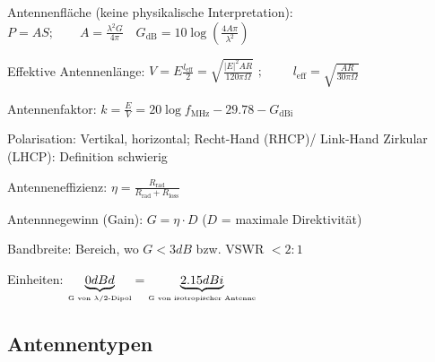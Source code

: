 \begin{liste}
    \item Antennenfläche (keine physikalische Interpretation): 
        $P = AS; \qquad A = \frac{\lambda^2 G}{4\pi} \quad G_{\text{dB}} = 10
        \log\left(\frac{4A\pi}{\lambda^2}\right)$
    \item Effektive Antennenlänge: 
    $V= E \frac{l_{\text{eff}}}2 = \sqrt{\frac{|E|^2AR}{120\pi \Omega}}$
    $;\qquad$ $l_{\text{eff}} = \sqrt{\frac{AR}{30\pi \Omega}}$
    \item Antennenfaktor: $k = \frac{E}{V} = 20 \log
    f_{\text{MHz}}-29.78-G_{\text{dBi}}$
    \item Polarisation: Vertikal, horizontal; Recht-Hand (RHCP)/
    Link-Hand Zirkular (LHCP): Definition schwierig 
    \item Antenneneffizienz: $\eta = \frac{R_{\text{rad}}}{R_{\text{rad}} +
    R_{\text{loss}}}$
    \item Antennnegewinn (Gain): $G=\eta \cdot D$ ($D$ = maximale Direktivität)
    \item Bandbreite: Bereich, wo $G < 3dB$ bzw. VSWR $< 2:1$
    \item Einheiten: $\underbrace{0dBd}_{\text{\tiny{G von $\lambda/2$-Dipol}}}
    = \underbrace{2.15dBi}_{\text{\tiny{G von isotropischer Antenne}}}$
\end{liste}

\subsection{Antennentypen }
